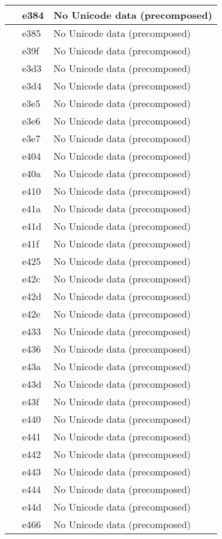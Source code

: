 \documentclass[12pt,letterpaper,openany]{book}
\begin{document}
\begin{center}
\begin{supertabular}{|m{0.25in}|m{0.5in}|m{4in}|}
 & e384 & No Unicode data (precomposed)\\\hline
 & e385 & No Unicode data (precomposed)\\\hline
 & e39f & No Unicode data (precomposed)\\\hline
 & e3d3 & No Unicode data (precomposed)\\\hline
 & e3d4 & No Unicode data (precomposed)\\\hline
 & e3e5 & No Unicode data (precomposed)\\\hline
 & e3e6 & No Unicode data (precomposed)\\\hline
 & e3e7 & No Unicode data (precomposed)\\\hline
 & e404 & No Unicode data (precomposed)\\\hline
 & e40a & No Unicode data (precomposed)\\\hline
 & e410 & No Unicode data (precomposed)\\\hline
 & e41a & No Unicode data (precomposed)\\\hline
 & e41d & No Unicode data (precomposed)\\\hline
 & e41f & No Unicode data (precomposed)\\\hline
 & e425 & No Unicode data (precomposed)\\\hline
 & e42c & No Unicode data (precomposed)\\\hline
 & e42d & No Unicode data (precomposed)\\\hline
 & e42e & No Unicode data (precomposed)\\\hline
 & e433 & No Unicode data (precomposed)\\\hline
 & e436 & No Unicode data (precomposed)\\\hline
 & e43a & No Unicode data (precomposed)\\\hline
 & e43d & No Unicode data (precomposed)\\\hline
 & e43f & No Unicode data (precomposed)\\\hline
 & e440 & No Unicode data (precomposed)\\\hline
 & e441 & No Unicode data (precomposed)\\\hline
 & e442 & No Unicode data (precomposed)\\\hline
 & e443 & No Unicode data (precomposed)\\\hline
 & e444 & No Unicode data (precomposed)\\\hline
 & e44d & No Unicode data (precomposed)\\\hline
 & e466 & No Unicode data (precomposed)\\\hline

\end{supertabular}
\end{center}
\end{document}
